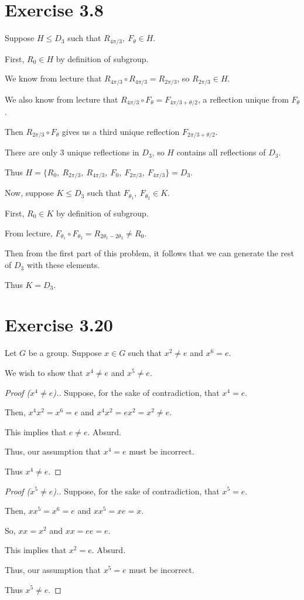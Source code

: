 \documentclass{article}
\begin{document}
\section*{Exercise 3.8}
Suppose \(H\leq D_3\) such that \(R_{4\pi/3},\ F_\theta\in H\).

First, \(R_0\in H\) by definition of subgroup.

We know from lecture that \(R_{4\pi/3}\circ R_{4\pi/3} = R_{2\pi/3}\), so \(R_{2\pi/3} \in H\).

We also know from lecture that \(R_{4\pi/3} \circ F_\theta=F_{4\pi/3+\theta/2}\), a reflection unique from \(F_\theta\).

Then \(R_{2\pi/3} \circ F_\theta\) gives us a third unique reflection \(F_{2\pi/3+\theta/2}\).

There are only 3 unique reflections in \(D_3\), so \(H\) contains all reflections of \(D_3\).

Thus \(H=\{R_0,\ R_{2\pi/3},\ R_{4\pi/3},\ F_{0},\ F_{2\pi/3},\ F_{4\pi/3}\}=D_3\).

Now, suppose \(K\leq D_3\) such that \(F_{\theta_1},\ F_{\theta_2}\in K\).

First, \(R_0\in K\) by definition of subgroup.

From lecture, \(F_{\theta_1}\circ F_{\theta_2}=R_{2\theta_1-2\theta_2}\neq R_0\).

Then from the first part of this problem, it follows that we can generate the rest of \(D_3\) with these elements.

Thus \(K=D_3\).

\section*{Exercise 3.20}
Let \(G\) be a group. Suppose \(x\in G\) such that \(x^2\neq e\) and \(x^6=e\).

We wish to show that \(x^4\neq e\) and \(x^5\neq e\).

\begin{proof}[Proof (\(x^4\neq e\)).]
Suppose, for the sake of contradiction, that \(x^4=e\).

Then, \(x^4x^2=x^6=e\) and \(x^4x^2=ex^2=x^2\neq e\).

This implies that \(e\neq e\). Absurd.

Thus, our assumption that \(x^4=e\) must be incorrect.

Thus \(x^4\neq e\).
\end{proof}

\begin{proof}[Proof (\(x^5\neq e\)).]
Suppose, for the sake of contradiction, that \(x^5=e\).

Then, \(xx^5=x^6=e\) and \(xx^5=xe=x\).

So, \(xx=x^2\) and \(xx=ee=e\).

This implies that \(x^2=e\). Absurd.

Thus, our assumption that \(x^5=e\) must be incorrect.

Thus \(x^5\neq e\).
\end{proof}
\end{document}
